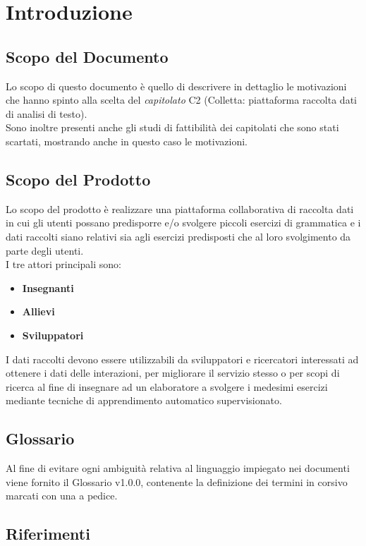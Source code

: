 \section{Introduzione}
\subsection{Scopo del Documento}
Lo scopo di questo documento è quello di descrivere in dettaglio le motivazioni che hanno spinto alla scelta del \textit{capitolato} C2 (Colletta: piattaforma raccolta dati di analisi di testo).\\ Sono inoltre presenti anche gli studi di fattibilità dei capitolati che sono stati scartati, mostrando anche in questo caso le motivazioni.
	
\subsection{Scopo del Prodotto}
Lo scopo del prodotto è realizzare una piattaforma collaborativa di raccolta dati in cui gli utenti possano predisporre
e/o svolgere piccoli esercizi di grammatica e i dati raccolti siano relativi sia agli esercizi predisposti che al loro svolgimento da parte degli utenti.\\
I tre attori principali sono:
\begin{itemize}
 \item \textbf{Insegnanti}
 \item \textbf{Allievi}
 \item \textbf{Sviluppatori}
\end{itemize}

I dati raccolti devono essere utilizzabili da sviluppatori e ricercatori interessati ad ottenere i dati delle interazioni, per
migliorare il servizio stesso o per scopi di ricerca al fine di insegnare ad un elaboratore a svolgere i medesimi esercizi mediante tecniche di apprendimento automatico supervisionato.\\

\subsection{Glossario}
Al fine di evitare ogni ambiguità relativa al linguaggio impiegato nei documenti viene
fornito il Glossario v1.0.0, contenente la definizione dei termini in corsivo marcati con
una a pedice.
	
\subsection{Riferimenti}

